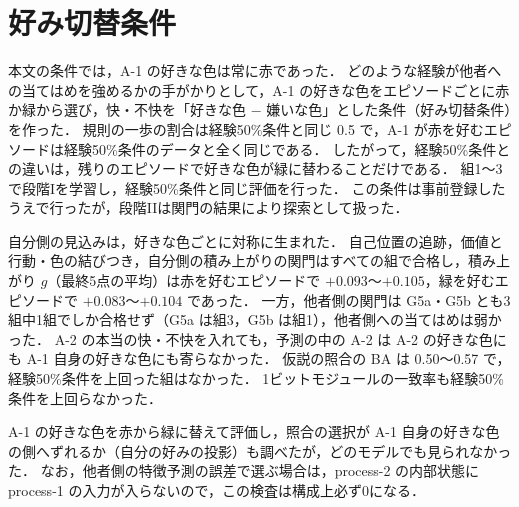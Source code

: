 \section{好み切替条件}\label{app:switch}
本文の条件では，A-1 の好きな色は常に赤であった．
どのような経験が他者への当てはめを強めるかの手がかりとして，A-1 の好きな色をエピソードごとに赤か緑から選び，快・不快を「好きな色 $-$ 嫌いな色」とした条件（好み切替条件）を作った．
規則の一歩の割合は経験50\%条件と同じ 0.5 で，A-1 が赤を好むエピソードは経験50\%条件のデータと全く同じである．
したがって，経験50\%条件との違いは，残りのエピソードで好きな色が緑に替わることだけである．
組1〜3 で段階Iを学習し，経験50\%条件と同じ評価を行った．
この条件は事前登録したうえで行ったが，段階IIは関門の結果により探索として扱った．

自分側の見込みは，好きな色ごとに対称に生まれた．
自己位置の追跡，価値と行動・色の結びつき，自分側の積み上がりの関門はすべての組で合格し，積み上がり $g$（最終5点の平均）は赤を好むエピソードで $+0.093$〜$+0.105$，緑を好むエピソードで $+0.083$〜$+0.104$ であった．
一方，他者側の関門は G5a・G5b とも3組中1組でしか合格せず（G5a は組3，G5b は組1），他者側への当てはめは弱かった．
A-2 の本当の快・不快を入れても，予測の中の A-2 は A-2 の好きな色にも A-1 自身の好きな色にも寄らなかった．
仮説の照合の BA は 0.50〜0.57 で，経験50\%条件を上回った組はなかった．
1ビットモジュールの一致率も経験50\%条件を上回らなかった．

A-1 の好きな色を赤から緑に替えて評価し，照合の選択が A-1 自身の好きな色の側へずれるか（自分の好みの投影）も調べたが，どのモデルでも見られなかった．
なお，他者側の特徴予測の誤差で選ぶ場合は，process-2 の内部状態に process-1 の入力が入らないので，この検査は構成上必ず0になる．

